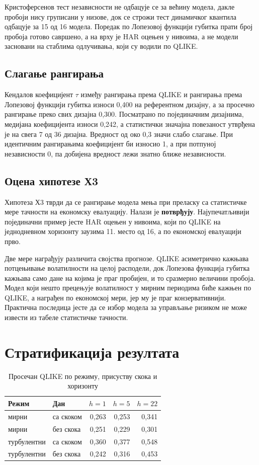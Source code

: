 Кристоферсенов тест независности не одбацује се за већину модела, дакле пробоји нису
груписани у низове, док се строжи тест динамичког квантила одбацује за 15 од
16 модела. Поредак по Лопезовој функцији губитка прати број пробоја готово
савршено, а на врху је HAR оцењен у нивоима, а не модели засновани на стаблима
одлучивања, који су водили по QLIKE.

\subsection{Слагање рангирања}

Кендалов коефицијент $\tau$ између рангирања према QLIKE и рангирања према Лопезовој
функцији губитка износи 0,400 на референтном дизајну, а за просечно рангирање преко свих
дизајна 0,300. Посматрано по појединачним дизајнима, медијана коефицијента износи 0,242,
а статистички значајна повезаност утврђена је на свега 7 од 36 дизајна. Вредност од око 0,3 значи слабо слагање. При идентичним
рангирањима коефицијент би износио 1, а при потпуној независности 0, па добијена
вредност лежи знатно ближе независности.

\subsection{Оцена хипотезе Х3}

Хипотеза Х3 тврди да се рангирање модела мења при преласку са статистичке мере тачности
на економску евалуацију. Налази је \textbf{потврђују}. Најупечатљивији појединачни пример
јесте HAR оцењен у нивоима, који по QLIKE на једнодневном хоризонту заузима 11.
место од 16, а по економској евалуацији прво.

Две мере награђују различита својства прогнозе. QLIKE асиметрично кажњава потцењивање
волатилности на целој расподели, док Лопезова функција губитка кажњава само дане на
којима је праг пробијен, и то сразмерно величини пробоја. Модел који нешто прецењује
волатилност у мирним периодима биће кажњен по QLIKE, а награђен по економској мери, јер
му је праг конзервативнији. Практична последица јесте да се избор модела за управљање
ризиком не може извести из табеле статистичке тачности.

\section{Стратификација резултата}
\label{sec:rez-stratifikacija}

\begin{table}[htbp]
\centering
\caption{Просечан QLIKE по режиму, присуству скока и хоризонту}
\label{tab:strat}
\begin{tabular}{llrrr}
\toprule
Режим & Дан & $h = 1$ & $h = 5$ & $h = 22$ \\
\midrule
мирни      & са скоком  & 0,263 & 0,253 & 0,341 \\
мирни      & без скока  & 0,251 & 0,229 & 0,301 \\
турбулентни & са скоком  & 0,360 & 0,377 & 0,548 \\
турбулентни & без скока  & 0,242 & 0,316 & 0,453 \\
\bottomrule
\end{tabular}
\end{table}


